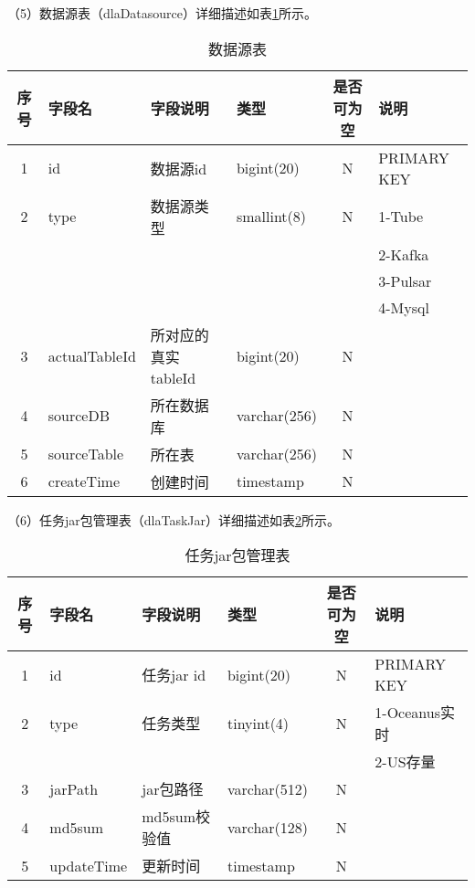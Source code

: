 （5）数据源表（dlaDatasource）详细描述如表\ref{tab:数据源表}所示。

\begin{table}[H]
  \centering
  \caption{数据源表}
  \label{tab:数据源表}
  \begin{tabular}{clllcl}
    \toprule
    序号  & 字段名              & 字段说明           & 类型           & 是否可为空   & 说明  \\
    \midrule
    1    & id                 & 数据源id           & bigint(20)    & N          & PRIMARY KEY    \\
    2    & type               & 数据源类型          & smallint(8)   & N          & 1-Tube   \\
         &                    &                   &               &            & 2-Kafka  \\
         &                    &                   &               &            & 3-Pulsar  \\
         &                    &                   &               &            & 4-Mysql  \\
    3    & actualTableId      & 所对应的真实tableId  & bigint(20)   & N          &   \\
    4    & sourceDB           & 所在数据库          & varchar(256)  & N          &   \\
    5    & sourceTable        & 所在表             & varchar(256)  & N          &   \\
    6    & createTime         & 创建时间           & timestamp     & N          &    \\
    \bottomrule
  \end{tabular}
\end{table}

（6）任务jar包管理表（dlaTaskJar）详细描述如表\ref{tab:任务jar包管理表}所示。

\begin{table}[H]
  \centering
  \caption{任务jar包管理表}
  \label{tab:任务jar包管理表}
  \begin{tabular}{clllcl}
    \toprule
    序号  & 字段名              & 字段说明           & 类型           & 是否可为空   & 说明  \\
    \midrule
    1    & id                 & 任务jar id        & bigint(20)     & N          & PRIMARY KEY    \\
    2    & type               & 任务类型           & tinyint(4)    & N           & 1-Oceanus实时   \\
         &                    &                   &               &            & 2-US存量   \\
    3    & jarPath            & jar包路径         & varchar(512)   & N          &   \\
    4    & md5sum             & md5sum校验值      & varchar(128)   & N          &   \\
    5    & updateTime         & 更新时间           & timestamp     & N          &   \\
    \bottomrule
  \end{tabular}
\end{table}

